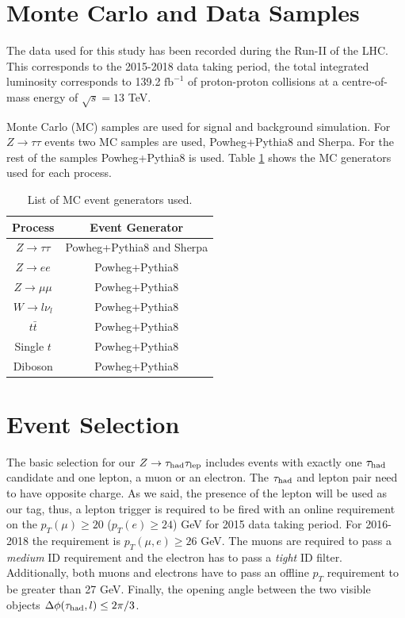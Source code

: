 \section{Monte Carlo and Data Samples}
The data used for this study has been recorded during the Run-II of the LHC. This corresponds to the 2015-2018 data taking period, the total integrated luminosity corresponds to 139.2 $\text{fb}^{-1}$ of proton-proton collisions at a centre-of-mass energy of $\sqrt{s}=13$ TeV.

Monte Carlo (MC) samples are used for signal and background simulation. For $Z\to\tau\tau$ events two MC samples are used, Powheg+Pythia8 and Sherpa. For the rest of the samples Powheg+Pythia8 is used. Table \ref{Table3} shows the MC generators used for each process.

\begin{table}[]
	\centering
	\begin{tabular}{cc}
		\hline
		\multicolumn{1}{|c|}{Process}  & \multicolumn{1}{c|}{Event Generator} \\ \hline
		$Z\to\tau\tau$                 & Powheg+Pythia8 and Sherpa            \\
		$Z\to ee$                      & Powheg+Pythia8                       \\
		$Z\to\mu\mu$                   & Powheg+Pythia8                       \\
		$W\to l\nu_l$				   & Powheg+Pythia8                       \\
		$t\bar{t}$                     & Powheg+Pythia8                       \\
		Single $t$                     & Powheg+Pythia8                       \\
		Diboson                        & Powheg+Pythia8                       \\ \hline
	\end{tabular}
	\caption{List of MC event generators used.}
	\label{Table3}
\end{table}
\section{Event Selection}\label{chap4sec3}
The basic selection for our $Z\to\tau_\text{had}\tau_\text{lep}$ includes events with exactly one $\tau_\text{had}$ candidate and one lepton, a muon or an electron. The $\tau_\text{had}$ and lepton pair need to have opposite charge. As we said, the presence of the lepton will be used as our tag, thus, a lepton trigger is required to be fired with an online requirement on the $p_{T}(\mu)\geq 20$ ($p_{T}(e)\geq 24$) GeV for 2015 data taking period. For 2016-2018 the requirement is $p_{T}(\mu,e)\geq 26$ GeV. The muons are required to pass a \textit{medium} ID requirement and the electron has to pass a \textit{tight} ID filter. Additionally, both muons and electrons have to pass an offline $p_T$ requirement to be greater than 27 GeV. Finally, the opening angle between the two visible objects $\Delta\phi(\tau_\text{had},l)\leq 2\pi/3$.

